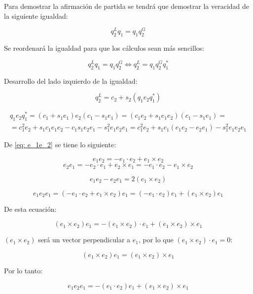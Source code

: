 \documentclass[12pt, a4paper]{report}
\begin{document}
Para demostrar la afirmación de partida se tendrá que demostrar la veracidad de la siguiente igualdad:

\begin{equation}
q_2^Lq_1 = q_1q_2^G
\end{equation}

Se reordenará la igualdad para que los cálculos sean más sencillos:

\begin{equation} \label{eq: E01}
q_2^Lq_1 = q_1q_2^G \iff q_2^L = q_1q_2^Gq_1^*
\end{equation}

Desarrollo del lado izquierdo de la igualdad:

\begin{equation} \label{eq: q_2I}
q_2^L = c_2 + s_2(q_1e_2q_1^*)
\end{equation}

\begin{multline} \label{eq: q_1e_2q_1}
q_1e_2q_1^* = (c_1 + s_1e_1)e_2(c_1 - s_1e_1) = (c_1e_2 + s_1e_1e_2)(c_1 - s_1e_1) = \\
= c_1^2e_2 + s_1c_1e_1e_2 - c_1s_1e_2e_1 - s_1^2e_1e_2e_1 = c_1^2e_2 + s_1c_1(e_1e_2 - e_2e_1) - s_1^2e_1e_2e_1
\end{multline}

De \eqref{eq: e_1e_2} se tiene lo siguiente:

$$ e_1e_2 = -e_1 \cdot e_2 + e_1 \times e_2 $$
$$ e_2e_1 = -e_2 \cdot e_1 + e_2 \times e_1 = -e_1 \cdot e_2 - e_1 \times e_2 $$

\begin{equation} \label{eq: e_1e_2e_2e_1}
e_1 e_2 - e_2 e_1 = 2(e_1 \times e_2)
\end{equation}

$$ e_1 e_2 e_1 = (-e_1 \cdot e_2 + e_1 \times e_2)e_1 =(-e_1 \cdot e_2)e_1 + (e_1 \times e_2)e_1 $$

De esta ecuación:

$$ (e_1 \times e_2)e_1 = -(e_1 \times e_2) \cdot e_1 + (e_1 \times e_2) \times e_1 $$

$(e_1 \times e_2)$ será un vector perpendicular a $e_1$, por lo que $(e_1 \times e_2) \cdot e_1 = 0$:

$$ (e_1 \times e_2)e_1 = (e_1 \times e_2) \times e_1 $$

Por lo tanto:

\begin{equation} \label{eq: e_1e_2e_1}
e_1 e_2 e_1 = -(e_1 \cdot e_2)e_1 + (e_1 \times e_2) \times e_1
\end{equation}
\end{document}

